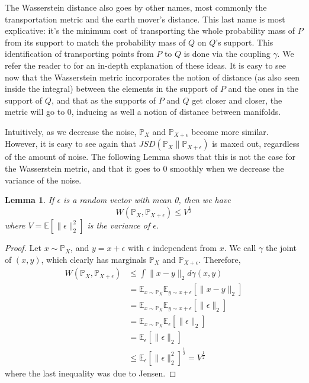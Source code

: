 \documentclass{article} %
\newcommand\EE{\mathbb{E}}
\newcommand\VV{\mathbb{V}}
\newcommand\PP{\mathbb{P}}
\newtheorem{lemma}{Lemma}
\theoremstyle{definition}
\begin{document}
The Wasserstein distance also goes by other names, most commonly the transportation metric
and the earth mover's distance. This last name is most explicative: it's the minimum cost
of transporting the whole probability mass of $P$ from its support to match the probability
mass of $Q$ on $Q$'s support. This identification of transporting points from $P$ to $Q$ is
done via the coupling $\gamma$. We refer the reader to \cite{Vil} for an in-depth explanation
of these ideas. It is easy to see now that the Wasserstein metric incorporates
the notion of distance (as also seen inside the integral) between the elements in the support
of $P$ and the ones in the support of $Q$, and that as the supports of $P$ and $Q$ get closer
and closer, the metric will go to 0, inducing as well a notion of distance between manifolds.

Intuitively, as we decrease the noise, $\PP_X$ and $\PP_{X + \epsilon}$ become
more similar. However, it is easy to see again that $JSD(\PP_X \| \PP_{X+\epsilon})$ 
is maxed out, regardless of the amount of noise. The following Lemma shows that this is not
the case for the Wasserstein metric, and that it goes to 0 smoothly when we
decrease the variance of the noise.
\begin{lemma} \label{lem::Wnoise}
  If $\epsilon$ is a random vector with mean 0, then we have 
$$W (\PP_{X}, \PP_{X + \epsilon}) \leq V^{\frac{1}{2}}$$ %
where $V = \EE[\|\epsilon\|_2^2]$ is the variance of
$\epsilon$.
\end{lemma}
\begin{proof}
  Let $x \sim \PP_X$, and $y = x + \epsilon$ with $\epsilon$ independent from
$x$. We call $\gamma$ the joint of $(x, y)$, which clearly has marginals 
$\PP_X$ and $\PP_{X + \epsilon}$. Therefore,
\begin{align*}
  W(\PP_X, \PP_{X + \epsilon}) &\leq \int \|x - y \|_2 d \gamma(x, y) \\
  &= \EE_{x \sim \PP_X} \EE_{y \sim x + \epsilon} [\|x - y\|_2] \\
  &= \EE_{x \sim \PP_X} \EE_{y \sim x + \epsilon} [ \| \epsilon \|_2 ] \\
  &= \EE_{x \sim \PP_X} \EE_{\epsilon} [\| \epsilon \|_2] \\
  &= \EE_{\epsilon} [ \| \epsilon \|_2 ] \\
  &\leq \EE_{\epsilon} [\| \epsilon\|_2^2 ]^{\frac{1}{2}} = V^{\frac{1}{2}}
\end{align*} 
where the last inequality was due to Jensen.
\end{proof}
\end{document}
